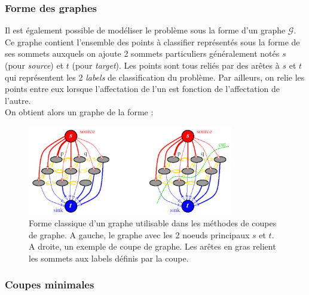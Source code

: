 \documentclass{article}
\newcommand{\G}{\mathcal{G}}
\begin{document}
\subsubsection{Forme des graphes}

Il est également possible de modéliser le problème sous la forme d'un graphe $\G$. Ce graphe contient l'ensemble des points à classifier représentés sous la forme de ses sommets auxquels on ajoute 2 sommets particuliers généralement notés $s$ (pour \textit{source}) et $t$ (pour \textit{target}). Les points sont tous reliés par des arêtes à $s$ et $t$ qui représentent les 2 \textit{labels} de classification du problème. Par ailleurs, on relie les points entre eux lorsque l'affectation de l'un est fonction de l'affectation de l'autre.\\
On obtient alors un graphe de la forme : 
\begin{figure}
	\begin{center}
		\includegraphics[width=0.8\textwidth]{Images/GC/graphcut.png} 
	\end{center}
	\caption{Forme classique d'un graphe utilisable dans les méthodes de coupes de graphe. A gauche, le graphe avec les 2 noeuds principaux $s$ et $t$. A droite, un exemple de coupe de graphe. Les arêtes en gras relient les sommets aux labels définis par la coupe.}
	\label{fig:GC_graphe}
\end{figure}

\subsubsection{Coupes minimales}
\end{document}
